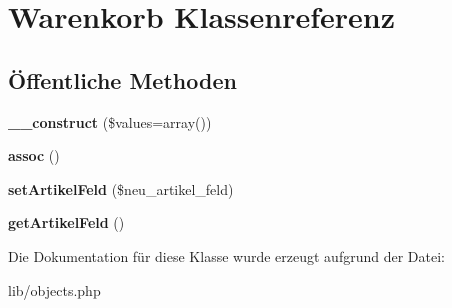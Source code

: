 \hypertarget{classWarenkorb}{\section{\-Warenkorb \-Klassenreferenz}
\label{classWarenkorb}
}
\subsection*{Öffentliche \-Methoden}
\begin{DoxyCompactItemize}
\item 
\hypertarget{classWarenkorb_a4bfc900376acfd4d2f7209d4a5e56bf9}{{\bfseries \-\_\-\-\_\-construct} (\$values=array())}\label{classWarenkorb_a4bfc900376acfd4d2f7209d4a5e56bf9}

\item 
\hypertarget{classWarenkorb_a4397c99a3a18b1851aaa517f88025e2b}{{\bfseries assoc} ()}\label{classWarenkorb_a4397c99a3a18b1851aaa517f88025e2b}

\item 
\hypertarget{classWarenkorb_ad2f4c6f92ce600725ddea544a5f219c5}{{\bfseries set\-Artikel\-Feld} (\$neu\-\_\-artikel\-\_\-feld)}\label{classWarenkorb_ad2f4c6f92ce600725ddea544a5f219c5}

\item 
\hypertarget{classWarenkorb_af18c96f0229f43bbeed4800a5c834172}{{\bfseries get\-Artikel\-Feld} ()}\label{classWarenkorb_af18c96f0229f43bbeed4800a5c834172}

\end{DoxyCompactItemize}


\-Die \-Dokumentation für diese \-Klasse wurde erzeugt aufgrund der \-Datei\-:\begin{DoxyCompactItemize}
\item 
lib/objects.\-php\end{DoxyCompactItemize}
